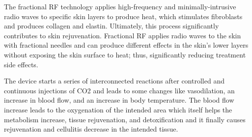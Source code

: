\documentclass[10pt,a4paper,ragged2e,withhyper]{altacv}
\begin{document}
\begin{paracol}{2}
\vbox{ %
	\justifying \noindent
	The fractional RF technology applies high-frequency and minimally-intrusive radio waves to specific skin layers to produce heat, which stimulates fibroblasts and produces collagen and elastin. Ultimately, this process significantly contributes to skin rejuvenation. Fractional RF applies radio waves to the skin with fractional needles and can produce different effects in the skin’s lower layers without exposing the skin surface to heat; thus, significantly reducing treatment side effects.
}
\divider

\vbox{ %
	\justifying \noindent
	The device starts a series of interconnected reactions after controlled and continuous injections of CO2 and leads to some changes like vasodilation, an increase in blood flow, and an increase in body temperature. The blood flow increase leads to the oxygenation of the intended area which itself helps the metabolism increase, tissue rejuvenation, and detoxification and it finally causes rejuvenation and cellulitis decrease in the intended tissue.
}
\divider

\nocite{*}


\end{paracol}
\end{document}
